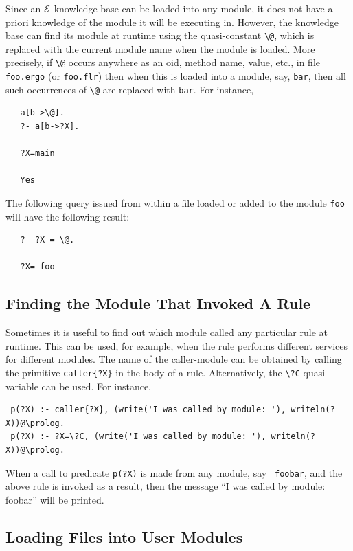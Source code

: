 \documentclass[11pt]{article}
\makeatletter
\newcommand{\ERGO}{\mbox{\ensuremath{\cal{E}}\smaller{{\sc{RGO}}}}\xspace}
\newcommand{\FLSYSTEM}{\ERGO}
\newcommand{\flrext}{flr\xspace}
\newcommand{\ergoext}{ergo\xspace}
\newcommand{\thismodule}{{\tt \bs{}@}\xspace}
\newcommand{\bs}{\textbackslash}
\makeatother
\begin{document}
\index{module!\thismodule}
\index{\thismodule}
%
Since an \FLSYSTEM knowledge base can be loaded into any module, it does not
have a priori knowledge of the module it will be executing in. However, the
knowledge base can find its module at runtime using the quasi-constant
\thismodule, which is replaced with the current module name when the module
is loaded. More precisely, if \thismodule occurs anywhere as an oid, method
name, value, etc., in file \texttt{foo.\ergoext} (or \texttt{foo.\flrext}) then when this is loaded
into a module, say, {\tt bar}, then all such occurrences of \thismodule are
replaced with {\tt bar}. For instance,
\begin{verbatim}
   a[b->\@].
   ?- a[b->?X].

   ?X=main

   Yes
\end{verbatim}
The following query issued from within a file loaded or added to
the module \texttt{foo} will have
the following result:
\begin{verbatim}
   ?- ?X = \@.

   ?X= foo
\end{verbatim}

\subsection{Finding the Module That Invoked A Rule}

\index{{\tt \bs{}?C} quasi-variable}
Sometimes it is useful to find out which module called any particular rule
at runtime. This can be used, for example, when the rule performs
different services for different modules. The name of the caller-module can
be obtained by calling the primitive {\tt caller\{?X\}}  in the body of a rule.
Alternatively, the \texttt{\bs{}?C} quasi-variable can be used. 
For instance, 
\begin{verbatim}
 p(?X) :- caller{?X}, (write('I was called by module: '), writeln(?X))@\prolog.
 p(?X) :- ?X=\?C, (write('I was called by module: '), writeln(?X))@\prolog.
\end{verbatim}
When a call to predicate {\tt p(?X)} is made from any module, say {\tt
  foobar}, and the above rule is invoked as a result, then the message ``I
was called by module: foobar'' will be printed. 


\subsection{Loading Files into User Modules}\label{sec-loading-mods}
\end{document}
